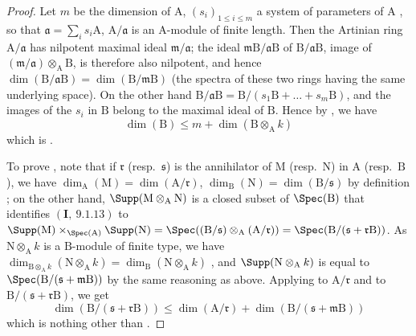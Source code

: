 \begin{proof}
Let $m$ be the dimension of $\mathrm{A}$, $(s_i)_{1\leq i\leq m}$ a system of parameters of $\mathrm{A}$ , so that $\mathfrak{a}=\sum_i s_i\mathrm{A}$, $\mathrm{A}/\mathfrak{a}$ is an $\mathrm{A}$-module of finite length.
Then the Artinian ring $\mathrm{A}/\mathfrak{a}$ has nilpotent maximal ideal $\mathfrak{m}/\mathfrak{a}$; the ideal $\mathfrak{m}\mathrm{B}/\mathfrak{a}\mathrm{B}$ of $\mathrm{B}/\mathfrak{a}\mathrm{B}$, image of $(\mathfrak{m}/\mathfrak{a})\otimes_\mathrm{A}\mathrm{B}$, is therefore also nilpotent, and hence $\dim(\mathrm{B}/\mathfrak{a}\mathrm{B})=\dim(\mathrm{B}/\mathfrak{m}\mathrm{B})$ (the spectra of these two rings having the same underlying space).
On the other hand $\mathrm{B}/\mathfrak{a}\mathrm{B}=\mathrm{B}/(s_1\mathrm{B}+\ldots+s_m\mathrm{B})$, and the images of the $s_i$ in $\mathrm{B}$ belong to the maximal ideal of $\mathrm{B}$.
Hence by , we have
\[
  \dim(\mathrm{B})\leq m+\dim(\mathrm{B}\otimes_\mathrm{A}k)
\]
which is .

To prove , note that if $\mathfrak{r}$ (resp.~$\mathfrak{s}$) is the annihilator of $\mathrm{M}$ (resp.~$\mathrm{N}$)  in $\mathrm{A}$ (resp.~$\mathrm{B}$), we have $\dim_\mathrm{A}(\mathrm{M})=\dim(\mathrm{A}/\mathfrak{r})$, $\dim_\mathrm{B}(\mathrm{N})=\dim(\mathrm{B}/\mathfrak{s})$ by definition ; on the other hand, $\Supp(\mathrm{M}\otimes_\mathrm{A}\mathrm{N})$ is a closed subset of $\Spec(\mathrm{B})$ that identifies $(\mathbf{I},~9.1.13)$ to $\Supp(\mathrm{M})\times_{\Spec(\mathrm{A})}\Supp(\mathrm{N})=\Spec((\mathrm{B}/\mathfrak{s})\otimes_\mathrm{A}(\mathrm{A}/\mathfrak{r}))=\Spec(\mathrm{B}/(\mathfrak{s}+\mathfrak{r}\mathrm{B}))$.
As $\mathrm{N}\otimes_\mathrm{A}k$ is a $\mathrm{B}$-module of finite type, we have $\dim_{\mathrm{B}\otimes_\mathrm{A}k}(\mathrm{N}\otimes_\mathrm{A}k)=\dim_\mathrm{B}(\mathrm{N}\otimes_\mathrm{A}k)$ , and $\Supp(\mathrm{N}\otimes_\mathrm{A}k)$ is equal to $\Spec(\mathrm{B}/(\mathfrak{s}+\mathfrak{m}\mathrm{B}))$ by the same reasoning as above.
Applying  to $\mathrm{A}/\mathfrak{r}$ and to $\mathrm{B}/(\mathfrak{s}+\mathfrak{r}\mathrm{B})$, we get
\[
  \dim(\mathrm{B}/(\mathfrak{s}+\mathfrak{r}\mathrm{B}))\leq\dim(\mathrm{A}/\mathfrak{r})+\dim(\mathrm{B}/(\mathfrak{s}+\mathfrak{m}\mathrm{B}))
\]
which is nothing other than .
\end{proof}

